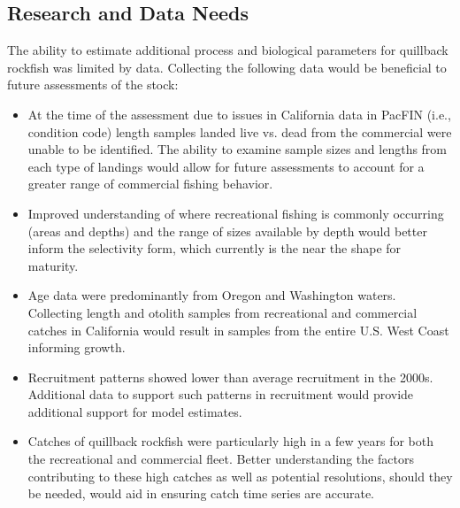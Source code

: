 \documentclass[11pt,
  english,
  a4paper,
]{article}
\begin{document}

\hypertarget{research-and-data-needs}{%
\subsection{Research and Data Needs}\label{research-and-data-needs}}

\leavevmode\tagmcend\tagstructend


The ability to estimate additional process and biological parameters for quillback rockfish was limited by data. Collecting the following data would be beneficial to future assessments of the stock:

\leavevmode\tagmcend\tagstructend\par

\begin{itemize}

  \item At the time of the assessment due to issues in California data in PacFIN (i.e., condition code) length samples landed live vs. dead from the commercial were unable to be identified. The ability to examine sample sizes and lengths from each type of landings would allow for future assessments to account for a greater range of commercial fishing behavior.
  
  \item Improved understanding of where recreational fishing is commonly occurring (areas and depths) and the range of sizes available by depth would better inform the selectivity form, which currently is the near the shape for maturity.  

    \item Age data were predominantly from Oregon and Washington waters. Collecting length and otolith samples from recreational and commercial catches in California would result in samples from the entire U.S. West Coast informing growth.
    
    \item Recruitment patterns showed lower than average recruitment in the 2000s. Additional data to support such patterns in recruitment would provide additional support for model estimates. 
    
    \item Catches of quillback rockfish were particularly high in a few years for both the recreational and commercial fleet. Better understanding the factors contributing to these high catches as well as potential resolutions, should they be needed, would aid in ensuring catch time series are accurate.  
    
\end{itemize}
\end{document}
